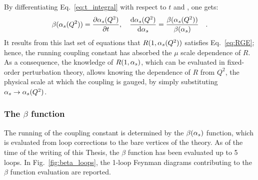 By differentiating Eq.~\ref{eq:t_integral} with respect to $t$ and \als, one gets:
\begin{equation}\label{eq:beta_def}
    \beta(\alpha_s(Q^2)) = \frac{\partial\alpha_s(Q^2)}{\partial t}, \quad \frac{\mathrm{d}\alpha_s(Q^2)}{\mathrm{d}\alpha_s} = \frac{\beta(\alpha_s (Q^2))}{\beta(\alpha_s)}\quad .
\end{equation}
It results from this last set of equations that $R(1,\alpha_s(Q^2))$ satisfies Eq.~\ref{eq:RGE}; hence, the running coupling constant has absorbed the $\mu$ scale dependence of $R$. As a consequence, the knowledge of $R(1,\alpha_s)$, which can be evaluated in fixed-order perturbation theory, allows knowing the dependence of $R$ from $Q^2$, the physical scale at which the coupling is gauged, by simply substituting $\alpha_s \rightarrow \alpha_s(Q^2)$. 

\subsubsection{The \ensuremath{\beta} function}
The running of the coupling constant is determined by the $\beta(\alpha_s)$ function, which is evaluated from loop corrections to the bare vertices of the theory. As of the time of the writing of this Thesis, the $\beta$ function has been evaluated up to 5 loops\cite{Herzog:2017ohr}. In Fig.~\ref{fig:beta_loops}, the 1-loop Feynman diagrams contributing to the $\beta$ function evaluation are reported.


